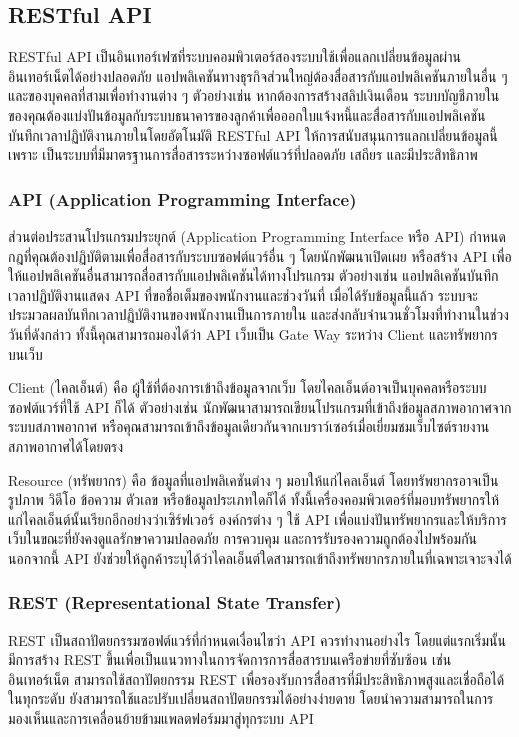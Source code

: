 \subsection{RESTful API}
RESTful API \cite{web:RESTful} เป็นอินเทอร์เฟซที่ระบบคอมพิวเตอร์สองระบบใช้เพื่อแลกเปลี่ยนข้อมูลผ่านอินเทอร์เน็ตได้อย่างปลอดภัย แอปพลิเคชันทางธุรกิจส่วนใหญ่ต้องสื่อสารกับแอปพลิเคชันภายในอื่น ๆ และของบุคคลที่สามเพื่อทำงานต่าง ๆ ตัวอย่างเช่น หากต้องการสร้างสลิปเงินเดือน ระบบบัญชีภายในของคุณต้องแบ่งปันข้อมูลกับระบบธนาคารของลูกค้าเพื่อออกใบแจ้งหนี้และสื่อสารกับแอปพลิเคชันบันทึกเวลาปฏิบัติงานภายในโดยอัตโนมัติ RESTful API ให้การสนับสนุนการแลกเปลี่ยนข้อมูลนี้ เพราะ เป็นระบบที่มีมาตรฐานการสื่อสารระหว่างซอฟต์แวร์ที่ปลอดภัย เสถียร และมีประสิทธิภาพ
\subsubsection{API (Application Programming Interface)}
ส่วนต่อประสานโปรแกรมประยุกต์ (Application Programming Interface หรือ API) กำหนดกฎที่คุณต้องปฏิบัติตามเพื่อสื่อสารกับระบบซอฟต์แวร์อื่น ๆ โดยนักพัฒนาเปิดเผย หรือสร้าง API เพื่อให้แอปพลิเคชันอื่นสามารถสื่อสารกับแอปพลิเคชันได้ทางโปรแกรม ตัวอย่างเช่น แอปพลิเคชันบันทึกเวลาปฏิบัติงานแสดง API ที่ขอชื่อเต็มของพนักงานและช่วงวันที่ เมื่อได้รับข้อมูลนี้แล้ว ระบบจะประมวลผลบันทึกเวลาปฏิบัติงานของพนักงานเป็นการภายใน และส่งกลับจำนวนชั่วโมงที่ทำงานในช่วงวันที่ดังกล่าว
ทั้งนี้คุณสามารถมองได้ว่า API เว็บเป็น Gate Way ระหว่าง Client และทรัพยากรบนเว็บ

Client (ไคลเอ็นต์) คือ ผู้ใช้ที่ต้องการเข้าถึงข้อมูลจากเว็บ โดยไคลเอ็นต์อาจเป็นบุคคลหรือระบบซอฟต์แวร์ที่ใช้ API ก็ได้ ตัวอย่างเช่น นักพัฒนาสามารถเขียนโปรแกรมที่เข้าถึงข้อมูลสภาพอากาศจากระบบสภาพอากาศ หรือคุณสามารถเข้าถึงข้อมูลเดียวกันจากเบราว์เซอร์เมื่อเยี่ยมชมเว็บไซต์รายงานสภาพอากาศได้โดยตรง

Resource (ทรัพยากร) คือ ข้อมูลที่แอปพลิเคชันต่าง ๆ มอบให้แก่ไคลเอ็นต์ โดยทรัพยากรอาจเป็นรูปภาพ วิดีโอ ข้อความ ตัวเลข หรือข้อมูลประเภทใดก็ได้ ทั้งนี้เครื่องคอมพิวเตอร์ที่มอบทรัพยากรให้แก่ไคลเอ็นต์นั้นเรียกอีกอย่างว่าเซิร์ฟเวอร์ องค์กรต่าง ๆ ใช้ API เพื่อแบ่งปันทรัพยากรและให้บริการเว็บในขณะที่ยังคงดูแลรักษาความปลอดภัย การควบคุม และการรับรองความถูกต้องไปพร้อมกัน นอกจากนี้ API ยังช่วยให้ลูกค้าระบุได้ว่าไคลเอ็นต์ใดสามารถเข้าถึงทรัพยากรภายในที่เฉพาะเจาะจงได้
\subsubsection{REST (Representational State Transfer)}
REST เป็นสถาปัตยกรรมซอฟต์แวร์ที่กำหนดเงื่อนไขว่า API ควรทำงานอย่างไร โดยแต่แรกเริ่มนั้น มีการสร้าง REST ขึ้นเพื่อเป็นแนวทางในการจัดการการสื่อสารบนเครือข่ายที่ซับซ้อน เช่น อินเทอร์เน็ต สามารถใช้สถาปัตยกรรม REST เพื่อรองรับการสื่อสารที่มีประสิทธิภาพสูงและเชื่อถือได้ในทุกระดับ ยังสามารถใช้และปรับเปลี่ยนสถาปัตยกรรมได้อย่างง่ายดาย โดยนำความสามารถในการมองเห็นและการเคลื่อนย้ายข้ามแพลตฟอร์มมาสู่ทุกระบบ API

